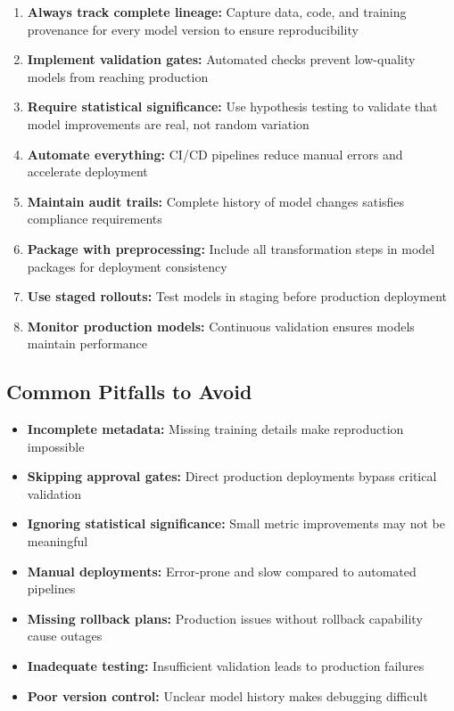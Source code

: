 \begin{enumerate}
    \item \textbf{Always track complete lineage:} Capture data, code, and training provenance for every model version to ensure reproducibility
    \item \textbf{Implement validation gates:} Automated checks prevent low-quality models from reaching production
    \item \textbf{Require statistical significance:} Use hypothesis testing to validate that model improvements are real, not random variation
    \item \textbf{Automate everything:} CI/CD pipelines reduce manual errors and accelerate deployment
    \item \textbf{Maintain audit trails:} Complete history of model changes satisfies compliance requirements
    \item \textbf{Package with preprocessing:} Include all transformation steps in model packages for deployment consistency
    \item \textbf{Use staged rollouts:} Test models in staging before production deployment
    \item \textbf{Monitor production models:} Continuous validation ensures models maintain performance
\end{enumerate}

\subsection{Common Pitfalls to Avoid}

\begin{itemize}
    \item \textbf{Incomplete metadata:} Missing training details make reproduction impossible
    \item \textbf{Skipping approval gates:} Direct production deployments bypass critical validation
    \item \textbf{Ignoring statistical significance:} Small metric improvements may not be meaningful
    \item \textbf{Manual deployments:} Error-prone and slow compared to automated pipelines
    \item \textbf{Missing rollback plans:} Production issues without rollback capability cause outages
    \item \textbf{Inadequate testing:} Insufficient validation leads to production failures
    \item \textbf{Poor version control:} Unclear model history makes debugging difficult
\end{itemize}

